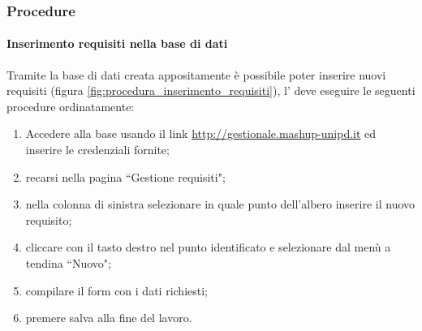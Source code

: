 		\subsubsection{Procedure}

			\paragraph{Inserimento requisiti nella base di dati}
			Tramite la base di dati creata appositamente è possibile poter inserire nuovi requisiti (figura \ref{fig:procedura_inserimento_requisiti}), l'\roleAnalyst{} deve eseguire le seguenti procedure ordinatamente:

				\begin{enumerate}
			 		\item Accedere alla base usando il link \url{http://gestionale.mashup-unipd.it} ed inserire le credenziali fornite;
			 		\item recarsi nella pagina ``Gestione requisiti";
					\item nella colonna di sinistra selezionare in quale punto dell'albero inserire il nuovo requisito;
					\item cliccare con il tasto destro nel punto identificato e selezionare dal menù a tendina ``Nuovo";
					\item compilare il form con i dati richiesti;
					\item premere salva alla fine del lavoro.
			 	\end{enumerate}

